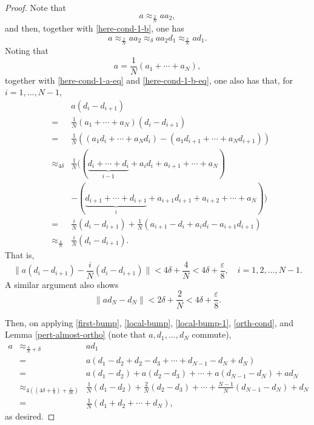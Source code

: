 \documentclass[12pt, oneside, psamsfonts]{amsart}
\theoremstyle{definition}
\theoremstyle{remark}
\numberwithin{equation}{section}
\newcommand{\norm}[1]{\| #1\|}
\newcommand{\eps}{\varepsilon}
\begin{document}
\begin{proof}
Note that $$a \approx_{\frac{2}{N}} aa_2,$$
and then, together with \eqref{here-cond-1-b}, one has
\begin{equation}\label{first-bump}
a \approx _{\frac{2}{N}} aa_2 \approx_{\delta } a a_2d_1 \approx_{\frac{2}{N}} ad_1.
\end{equation}
Noting that $$a = \frac{1}{N}(a_1 + \cdots + a_N),$$ together with \eqref{here-cond-1-a-eq} and  \eqref{here-cond-1-b-eq}, 
one also has that, for $i=1, ..., N-1$, 
\begin{eqnarray*}
& & a(d_i - d_{i+1})  \\
& = & \frac{1}{N}(a_1 + \cdots + a_N)(d_i - d_{i+1}) \nonumber \\
& = & \frac{1}{N}((a_1 d_i + \cdots + a_Nd_i) - (a_1 d_{i+1} + \cdots + a_Nd_{i+1})) \nonumber \\
& \approx_{4\delta} & \frac{1}{N}((\underbrace{d_i + \cdots + d_{i}}_{i-1} + a_id_i + a_{i+1} + \cdots + a_N) \\
&&  - (\underbrace{d_{i+1} + \cdots + d_{i+1}}_{i} +  a_{i+1}d_{i+1} + a_{i+2}+ \cdots + a_N)) \nonumber \\
& = & \frac{i}{N}(d_i - d_{i+1}) + \frac{1}{N}(a_{i+1}-d_{i} + a_id_i - a_{i+1}d_{i+1}) \nonumber \\
&\approx_{\frac{4}{N}}&  \frac{i}{N}(d_i - d_{i+1}). \nonumber
\end{eqnarray*}
That is, 
\begin{equation}\label{local-bump}
\norm{a(d_i - d_{i+1}) -  \frac{i}{N}(d_i - d_{i+1})} < 4\delta + \frac{4}{N} < 4\delta + \frac{\eps}{8},\quad i=1, 2, ..., N-1.
\end{equation}
A similar argument also shows
\begin{equation}\label{local-bump-1}
\norm{ad_N - d_N} < 2\delta + \frac{2}{N} < 4\delta + \frac{\eps}{8}.
\end{equation}

Then, on applying \eqref{first-bump}, \eqref{local-bump}, \eqref{local-bump-1}, \eqref{orth-cond}, and Lemma \ref{pert-almost-ortho} (note that $a, d_1, ..., d_N$ commute),
\begin{eqnarray*}
a & \approx_{\frac{4}{N} + \delta} & ad_1\\
& = & a(d_1 - d_2 + d_2 - d_3 + \cdots + d_{N-1} - d_{N} + d_{N}) \\
& = & a(d_1 - d_2) + a(d_2 - d_3) + \cdots + a(d_{N-1} - d_{N}) + ad_{N} \\
& \approx_{4((4\delta + \frac{\eps}{8}) + \frac{\eps}{16})} & \frac{1}{N}(d_1 - d_2) + \frac{2}{N}(d_2 - d_3)  + \cdots + \frac{N-1}{N}(d_{N-1} - d_{N}) + d_{N} \\
& = & \frac{1}{N}(d_1 + d_2 + \cdots + d_{N}),
\end{eqnarray*}
as desired.
\end{proof}
\end{document}
